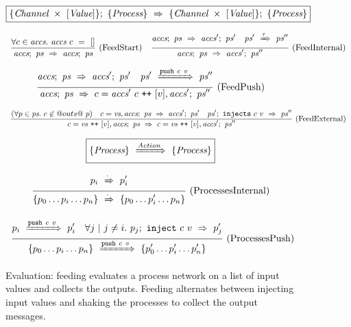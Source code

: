 
\begin{figure}

$$
  \boxed{
    \{\textit{Channel} ~\times~ [\textit{Value}]\};~\{ \textit{Process} \}~\Rightarrow~\{\textit{Channel} ~\times~ [\textit{Value}]\};~\{ \textit{Process} \}
  }
$$

\newcommand\vs {\ti{vs}}
\newcommand\accs {\ti{accs}}
\newcommand\network {\ti{ps}}

$$
\ruleIN{
  \forall c \in \accs.~
  \accs~c~=~[]
}{
  \ProcsFeed
    {\accs}
    {\network}
    {\accs}
    {\network}
}{FeedStart}
%
\ruleIN{
  \ProcsFeed
    {\accs}
    {\network}
    {\accs'}
    {\network'}
\quad
  \ProcsShake
    {\network'}
    {\tau}
    {\network''}
}{
  \ProcsFeed
    {\accs}
    {\network}
    {\accs'}
    {\network''}
}{FeedInternal}
$$

$$
\ruleIN{
  \ProcsFeed
    {\accs}
    {\network}
    {\accs'}
    {\network'}
\quad
  \ProcsShake
    {\network'}
    {\Push~c~v}
    {\network''}
}{
  \ProcsFeed
    {\accs}
    {\network}
    {c=\accs'~c \listappend [v], \accs'}
    {\network''}
}{FeedPush}
$$

$$
\ruleIN{
  (\forall p \in \network.~c \not\in @outs@~p)
\quad
  \ProcsFeed
    {c=\vs, \accs}
    {\network}
    {\accs'}
    {\network'}
\quad
  \ProcsInject
    {\network'}
    {c}{v}
    {\network''}
}{
  \ProcsFeed
    {c=\vs \listappend [v], \accs}
    {\network}
    {c=\vs \listappend [v], \accs'}
    {\network''}
}{FeedExternal}
$$

$$
  \boxed{\{ \textit{Process} \}~\xRightarrow{\textit{Action}}~\{ \textit{Process} \}}
$$

$$
\ruleIN{
  \ProcShake{p_i}{\cdot}{p'_i}
}{
  \ProcsShake{
    \sgl{p_0 \ldots p_i \ldots p_n}
  }{\cdot}{
    \sgl{p_0 \ldots p'_i \ldots p_n}
  }
}{ProcessesInternal}
$$

$$
\ruleIN{
  \ProcShake{p_i}{\Push~c~v}{p'_i}
  \quad
  \forall j~|~j \neq i.~
  \ProcInject{p_j}{c}{v}{p'_j}
}{
  \ProcsShake{
    \sgl{p_0 \ldots p_i \ldots p_n}
  }{\Push~c~v}{
    \sgl{p'_0 \ldots p'_i \ldots p'_n}
  }
}{ProcessesPush}
$$


\caption{Evaluation: feeding evaluates a process network on a list of input values and collects the outputs.
Feeding alternates between injecting input values and shaking the processes to collect the output messages.}
\label{fig:Process:Eval:Feed}
\end{figure}

